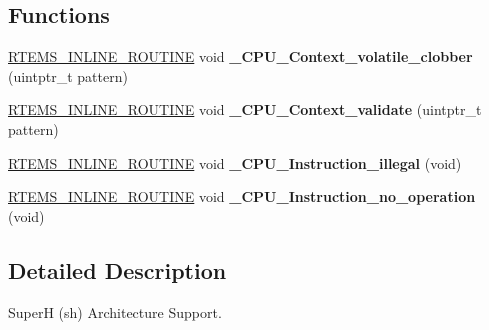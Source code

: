 \subsection*{Functions}
\begin{DoxyCompactItemize}
\item 
\mbox{\label{group__RTEMSScoreCPUsh_gaeb1ddd8f84f82b13fad2a05a3e7d0ab7}} 
\mbox{\hyperlink{group__RTEMSScoreBaseDefs_gac216239df231d5dbd15e3520b0b9313f}{R\+T\+E\+M\+S\+\_\+\+I\+N\+L\+I\+N\+E\+\_\+\+R\+O\+U\+T\+I\+NE}} void {\bfseries \+\_\+\+C\+P\+U\+\_\+\+Context\+\_\+volatile\+\_\+clobber} (uintptr\+\_\+t pattern)
\item 
\mbox{\label{group__RTEMSScoreCPUsh_gaae027d9a906bb67d38ebd7a9104b976b}} 
\mbox{\hyperlink{group__RTEMSScoreBaseDefs_gac216239df231d5dbd15e3520b0b9313f}{R\+T\+E\+M\+S\+\_\+\+I\+N\+L\+I\+N\+E\+\_\+\+R\+O\+U\+T\+I\+NE}} void {\bfseries \+\_\+\+C\+P\+U\+\_\+\+Context\+\_\+validate} (uintptr\+\_\+t pattern)
\item 
\mbox{\label{group__RTEMSScoreCPUsh_ga07618c93359f2485af2e98a96b330208}} 
\mbox{\hyperlink{group__RTEMSScoreBaseDefs_gac216239df231d5dbd15e3520b0b9313f}{R\+T\+E\+M\+S\+\_\+\+I\+N\+L\+I\+N\+E\+\_\+\+R\+O\+U\+T\+I\+NE}} void {\bfseries \+\_\+\+C\+P\+U\+\_\+\+Instruction\+\_\+illegal} (void)
\item 
\mbox{\label{group__RTEMSScoreCPUsh_gab683a0a37a089e2a0fd3c356836d5499}} 
\mbox{\hyperlink{group__RTEMSScoreBaseDefs_gac216239df231d5dbd15e3520b0b9313f}{R\+T\+E\+M\+S\+\_\+\+I\+N\+L\+I\+N\+E\+\_\+\+R\+O\+U\+T\+I\+NE}} void {\bfseries \+\_\+\+C\+P\+U\+\_\+\+Instruction\+\_\+no\+\_\+operation} (void)
\end{DoxyCompactItemize}


\subsection{Detailed Description}
SuperH (sh) Architecture Support. 

